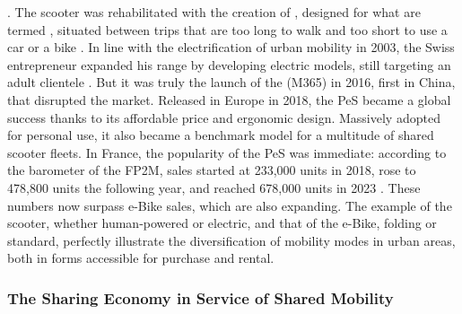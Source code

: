 \begin{refsegment}
{} \textcolor{blue}{\autocite{ma_trott_histoire_2020}}. The scooter was rehabilitated with the creation of , designed for what are termed , situated between trips that are too long to walk and too short to use a car or a bike \textcolor{blue}{\autocite{oconnell_travel_2002}}. In line with the electrification of urban mobility in 2003, the Swiss entrepreneur expanded his range by developing electric models, still targeting an adult clientele \textcolor{blue}{\autocite{ma_trott_histoire_2020}}. But it was truly the launch of the  (M365) in 2016, first in China, that disrupted the market. Released in Europe in 2018, the \acrshort{PeS} became a global success thanks to its affordable price and ergonomic design. Massively adopted for personal use, it also became a benchmark model for a multitude of shared scooter fleets. In France, the popularity of the \acrshort{PeS} was immediate: according to the barometer of the \acrfull{FP2M}, sales started at 233,000 units in 2018, rose to 478,800 units the following year, and reached 678,000 units in 2023 \textcolor{blue}{\autocites[1]{fp2m_barometre_2021}[1]{fp2m_ventes_2023}}. These numbers now surpass \acrshort{e-Bike} sales, which are also expanding. The example of the scooter, whether human-powered or electric, and that of the \acrshort{e-Bike}, folding or standard, perfectly illustrate the diversification of mobility modes in urban areas, both in forms accessible for purchase and rental.%

\subsubsection*{The Sharing Economy in Service of Shared Mobility
    \label{chap1:velo-micromobilite-innovations-partage}
    }


\end{refsegment}
